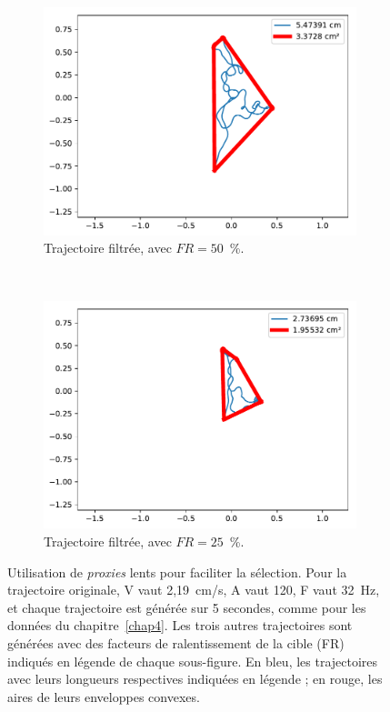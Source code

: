 \begin{figure}[!htb]
\begin{subfigure}[t]{0.49\textwidth}
			\centering
			\includegraphics[width=\textwidth]{figures/ch5/2_19_SpeedReduction_2_19_120_32_factor_0_5}
			\caption{Trajectoire filtrée, avec $FR = 50$~\%{}.}
			\label{fig:speedRed050}
		\end{subfigure}
		~
		\begin{subfigure}[t]{0.49\textwidth}
			\centering
			\includegraphics[width=\textwidth]{figures/ch5/2_19_SpeedReduction_2_19_120_32_factor_0_25}
			\caption{Trajectoire filtrée, avec $FR = 25$~\%{}.}
			\label{fig:speedRed025}
		\end{subfigure}
		\caption[Utilisation de \emph{proxies} lents]{Utilisation de \emph{proxies} lents pour faciliter la sélection. Pour la trajectoire originale, V vaut 2,19~cm/s, A vaut 120\textdegree{}, F vaut 32~Hz, et chaque trajectoire est générée sur 5 secondes, comme pour les données du chapitre~\ref{chap4}. Les trois autres trajectoires sont générées avec des facteurs de ralentissement de la cible (FR) indiqués en légende de chaque sous-figure. En bleu, les trajectoires avec leurs longueurs respectives indiquées en légende ; en rouge, les aires de leurs enveloppes convexes.}
		\label{fig:speedRed}
	\end{figure}
	
